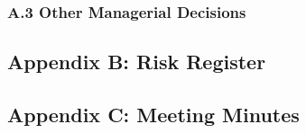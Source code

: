 \subsubsection*{A.3 Other Managerial Decisions}
\subsection*{Appendix B: Risk Register}
\subsection*{Appendix C: Meeting Minutes}











